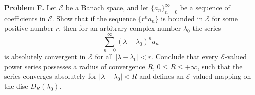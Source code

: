 \textbf{Problem F.} Let $\mathcal{E}$ be a Banach space, and let $\{a_n\}_{n=0}^{\infty}$ be a sequence of coefficients in $\mathcal{E}$. Show that if the sequence $\{r^n a_n\}$ is bounded in $\mathcal{E}$ for some positive number $r$, then for an arbitrary complex number $\lambda_0$ the series
$$\sum_{n=0}^{\infty} (\lambda - \lambda_0)^n a_n$$
is absolutely convergent in $\mathcal{E}$ for all $|\lambda - \lambda_0| < r$. Conclude that every $\mathcal{E}$-valued power series possesses a radius of convergence $R$, $0 \leq R \leq +\infty$, such that the series converges absolutely for $|\lambda - \lambda_0| < R$ and defines an $\mathcal{E}$-valued mapping on the disc $D_R(\lambda_0)$.

